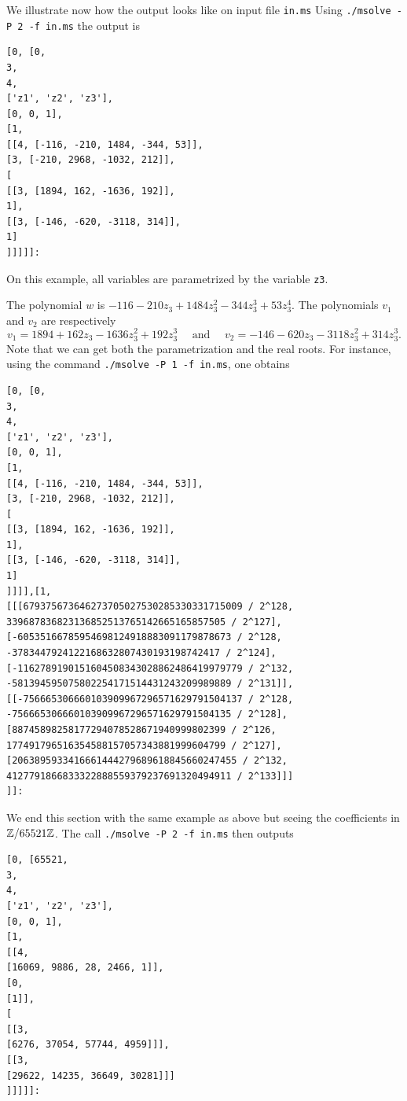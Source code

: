 \documentclass[a4paper,english,11pt]{scrartcl}
\theoremstyle{definition}
\theoremstyle{remark}
\begin{document}
We illustrate now how the output looks like on input file \verb+in.ms+
Using \verb+./msolve -P 2 -f in.ms+ the output is
\begin{tcolorbox} %
  \begin{lstlisting}
[0, [0,
3,
4,
['z1', 'z2', 'z3'],
[0, 0, 1],
[1,
[[4, [-116, -210, 1484, -344, 53]],
[3, [-210, 2968, -1032, 212]],
[
[[3, [1894, 162, -1636, 192]],
1],
[[3, [-146, -620, -3118, 314]],
1]
]]]]]:
  \end{lstlisting}
\end{tcolorbox}
On this example, all variables are parametrized by the variable \verb+z3+.

The polynomial $w$ is $-116 - 210 z_3 + 1484 z_3^2 -344 z_3^3 + 53 z_3^4$.
The polynomials $v_1$ and $v_2$ are respectively
\[
    v_1 = 1894 + 162 z_3 - 1636 z_3^2 + 192 z_3^3 \quad \text{ and }
    \quad v_2 = -146 -620 z_3 - 3118 z_3^2 + 314 z_3^3.
\]
Note that we can get both the parametrization and the real roots.
For instance, using the command
\verb+./msolve -P 1 -f in.ms+, one obtains
\begin{tcolorbox} %
  \begin{lstlisting}
[0, [0,
3,
4,
['z1', 'z2', 'z3'],
[0, 0, 1],
[1,
[[4, [-116, -210, 1484, -344, 53]],
[3, [-210, 2968, -1032, 212]],
[
[[3, [1894, 162, -1636, 192]],
1],
[[3, [-146, -620, -3118, 314]],
1]
]]]],[1,
[[[679375673646273705027530285330331715009 / 2^128, 339687836823136852513765142665165857505 / 2^127], [-60535166785954698124918883091179878673 / 2^128, -3783447924122168632807430193198742417 / 2^124], [-1162789190151604508343028862486419979779 / 2^132, -581394595075802254171514431243209989889 / 2^131]], [[-756665306660103909967296571629791504137 / 2^128, -756665306660103909967296571629791504135 / 2^128], [88745898258177294078528671940999802399 / 2^126, 177491796516354588157057343881999604799 / 2^127], [2063895933416661444279689618845660247455 / 2^132, 4127791866833322888559379237691320494911 / 2^133]]]
]]:
  \end{lstlisting}
\end{tcolorbox}

We end this section with the same example as above but seeing the coefficients in
\(\mathbb{Z}/65521\mathbb{Z}\).
The call \verb+./msolve -P 2 -f in.ms+ then outputs
\begin{tcolorbox} %
  \begin{lstlisting}
[0, [65521,
3,
4,
['z1', 'z2', 'z3'],
[0, 0, 1],
[1,
[[4,
[16069, 9886, 28, 2466, 1]],
[0,
[1]],
[
[[3,
[6276, 37054, 57744, 4959]]],
[[3,
[29622, 14235, 36649, 30281]]]
]]]]]:
  \end{lstlisting}
\end{tcolorbox}
\end{document}
